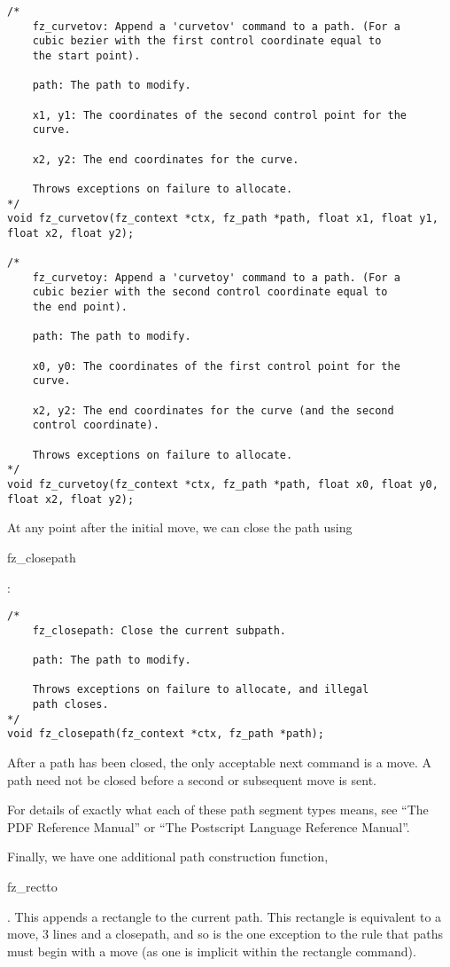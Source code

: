 \documentclass[oneside]{book}
\begin{document}
\begin{lstlisting}
/*
	fz_curvetov: Append a 'curvetov' command to a path. (For a
	cubic bezier with the first control coordinate equal to
	the start point).

	path: The path to modify.

	x1, y1: The coordinates of the second control point for the
	curve.

	x2, y2: The end coordinates for the curve.

	Throws exceptions on failure to allocate.
*/
void fz_curvetov(fz_context *ctx, fz_path *path, float x1, float y1, float x2, float y2);

/*
	fz_curvetoy: Append a 'curvetoy' command to a path. (For a
	cubic bezier with the second control coordinate equal to
	the end point).

	path: The path to modify.

	x0, y0: The coordinates of the first control point for the
	curve.

	x2, y2: The end coordinates for the curve (and the second
	control coordinate).

	Throws exceptions on failure to allocate.
*/
void fz_curvetoy(fz_context *ctx, fz_path *path, float x0, float y0, float x2, float y2);
\end{lstlisting}

At any point after the initial move, we can close the path using \begin{tt}fz\_closepath\end{tt}:

\begin{lstlisting}
/*
	fz_closepath: Close the current subpath.

	path: The path to modify.

	Throws exceptions on failure to allocate, and illegal
	path closes.
*/
void fz_closepath(fz_context *ctx, fz_path *path);
\end{lstlisting}

After a path has been closed, the only acceptable next command is a move. A path need not be closed before a second or subsequent move is sent.

For details of exactly what each of these path segment types means, see ``The PDF Reference Manual'' or ``The Postscript Language Reference Manual''.

Finally, we have one additional path construction function, \begin{tt}fz\_rectto\end{tt}. This appends a rectangle to the current path. This rectangle is equivalent to a move, 3 lines and a closepath, and so is the one exception to the rule that paths must begin with a move (as one is implicit within the rectangle command).
\end{document}
